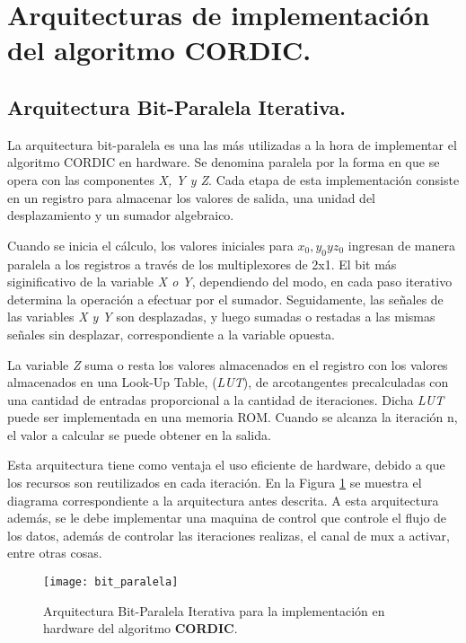 \section{Arquitecturas de implementación del algoritmo \textbf{CORDIC}.}

\subsection{Arquitectura Bit-Paralela Iterativa.}

La arquitectura bit-paralela es una las más utilizadas a la hora de implementar el algoritmo CORDIC en hardware. Se denomina paralela por la forma en que se opera con las componentes \textit{X, Y y Z}. Cada etapa de esta implementación consiste en un registro para almacenar los valores de salida, una unidad del desplazamiento y un sumador algebraico. 

Cuando se inicia el cálculo, los valores iniciales para $x_{0}, y_{0} y z_{0}$ ingresan de manera paralela a los registros a través de los multiplexores de 2x1. El bit más siginificativo de la variable \textit{X o Y}, dependiendo del modo, en cada paso iterativo determina la operación a efectuar por el sumador. Seguidamente, las señales de las variables \textit{X y Y} son desplazadas, y luego sumadas o restadas a las mismas señales sin desplazar, correspondiente a la variable opuesta. 

La variable \textit{Z} suma o resta los valores almacenados en el registro con los valores almacenados en una Look-Up Table, (\textit{LUT}), de arcotangentes precalculadas con una cantidad de entradas proporcional a la cantidad de iteraciones. Dicha \textit{LUT} puede ser implementada en una memoria ROM. Cuando se alcanza la iteración n, el valor a calcular se puede obtener en la salida. 

Esta arquitectura tiene como ventaja el uso eficiente de hardware, debido a que los recursos son reutilizados en cada iteración. En la Figura \ref{fig:bit_paralela} se muestra el diagrama correspondiente a la arquitectura antes descrita. A esta arquitectura además, se le debe implementar una maquina de control que controle el flujo de los datos, además de controlar las iteraciones realizas, el canal de mux a activar, entre otras cosas.

\begin{figure}[htb]
  \centering
  \texttt{[image: bit\_paralela]}
  \caption{Arquitectura Bit-Paralela Iterativa para la implementación en hardware del algoritmo \textbf{CORDIC}.}
  \label{fig:bit_paralela}
\end{figure}

